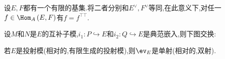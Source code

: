 \begin{corollary}{}{}
	设$E,F$都有一个有限的基集.将二者分别和$E^{\vee},F^{\vee}$等同,在此意义下,对任一$f\in\Hom_{A}\left(E,F\right)$有$f=f^{\top\top}$.
\end{corollary}

\begin{lemma}{}{}
	设$M$和$N$是$E$的互补子模,$i_{1}:P\hookrightarrow E$和$i_{2}:Q\hookrightarrow E$是典范嵌入,则下图交换:
	\begin{center}
	\end{center}
\end{lemma}

\begin{corollary}{}{}
	若$E$是投射模(相对的,有限生成的投射模),则$\ev_{E}$是单射(相对的,双射).
\end{corollary}